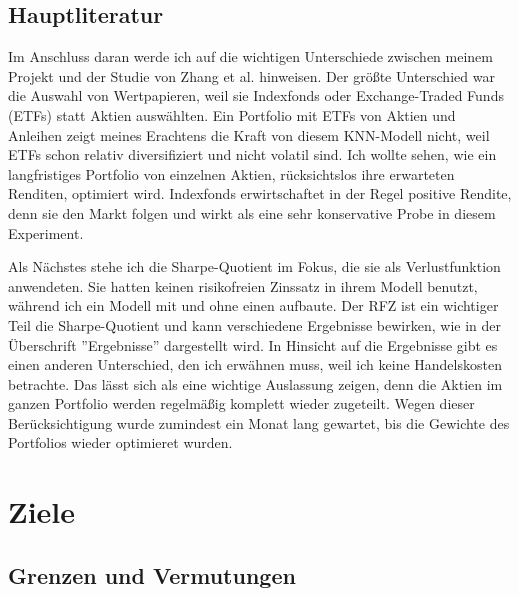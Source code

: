 \documentclass[12pt]{article}
\begin{document}
        \subsection{Hauptliteratur}
        
            Im Anschluss daran werde ich auf die wichtigen Unterschiede zwischen meinem Projekt 
            und der Studie von Zhang et al. \cite{zhang2020} hinweisen. 
            Der größte Unterschied war die Auswahl von Wertpapieren, 
            weil sie Indexfonds oder Exchange-Traded Funds (ETFs) statt Aktien auswählten. 
            Ein Portfolio mit ETFs von Aktien und Anleihen zeigt meines Erachtens die Kraft von diesem KNN-Modell nicht, 
            weil ETFs schon relativ diversifiziert und nicht volatil sind. 
            Ich wollte sehen, wie ein langfristiges Portfolio von einzelnen Aktien, 
            rücksichtslos ihre erwarteten Renditen, optimiert wird. Indexfonds erwirtschaftet in der Regel positive Rendite, 
            denn sie den Markt folgen und wirkt als eine sehr konservative Probe in diesem Experiment.

            Als Nächstes stehe ich die Sharpe-Quotient im Fokus, die sie als Verlustfunktion anwendeten. 
            Sie hatten keinen risikofreien Zinssatz in ihrem Modell benutzt, während ich ein Modell mit und ohne einen aufbaute. 
            Der RFZ ist ein wichtiger Teil die Sharpe-Quotient und kann verschiedene Ergebnisse bewirken, 
            wie in der Überschrift ''Ergebnisse'' dargestellt wird. In Hinsicht auf die Ergebnisse gibt es einen anderen Unterschied, 
            den ich erwähnen muss, weil ich keine Handelskosten betrachte. Das lässt sich als eine wichtige Auslassung zeigen, 
            denn die Aktien im ganzen Portfolio werden regelmäßig komplett wieder zugeteilt. 
            Wegen dieser Berücksichtigung wurde zumindest ein Monat lang gewartet, 
            bis die Gewichte des Portfolios wieder optimieret wurden.

    \section{Ziele}

        \subsection{Grenzen und Vermutungen}
    
\end{document}
